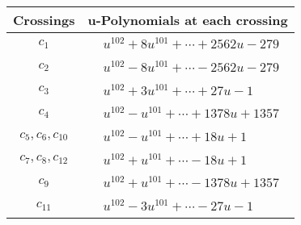 \documentclass[1p]{elsarticle_modified}
\theoremstyle{definition}
\begin{document}
\begin{tabular}{m{50pt}|m{274pt}}
Crossings & \hspace{64pt}u-Polynomials at each crossing \\
\hline $$\begin{aligned}c_{1}\end{aligned}$$&$\begin{aligned}
&u^{102}+8 u^{101}+\cdots+2562 u-279
\end{aligned}$\\
\hline $$\begin{aligned}c_{2}\end{aligned}$$&$\begin{aligned}
&u^{102}-8 u^{101}+\cdots-2562 u-279
\end{aligned}$\\
\hline $$\begin{aligned}c_{3}\end{aligned}$$&$\begin{aligned}
&u^{102}+3 u^{101}+\cdots+27 u-1
\end{aligned}$\\
\hline $$\begin{aligned}c_{4}\end{aligned}$$&$\begin{aligned}
&u^{102}- u^{101}+\cdots+1378 u+1357
\end{aligned}$\\
\hline $$\begin{aligned}c_{5},c_{6},c_{10}\end{aligned}$$&$\begin{aligned}
&u^{102}- u^{101}+\cdots+18 u+1
\end{aligned}$\\
\hline $$\begin{aligned}c_{7},c_{8},c_{12}\end{aligned}$$&$\begin{aligned}
&u^{102}+u^{101}+\cdots-18 u+1
\end{aligned}$\\
\hline $$\begin{aligned}c_{9}\end{aligned}$$&$\begin{aligned}
&u^{102}+u^{101}+\cdots-1378 u+1357
\end{aligned}$\\
\hline $$\begin{aligned}c_{11}\end{aligned}$$&$\begin{aligned}
&u^{102}-3 u^{101}+\cdots-27 u-1
\end{aligned}$\\
\hline
\end{tabular}\\~\\
\end{document}
